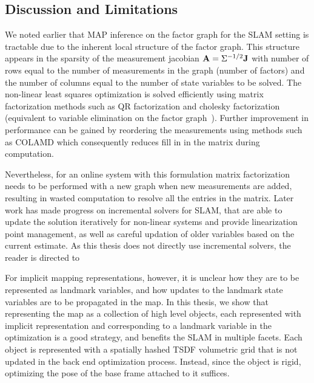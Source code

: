 \subsection{Discussion and Limitations}

We noted earlier that MAP inference on the factor graph for the SLAM setting is tractable due to the inherent local structure of the factor graph. This structure appears in the sparsity of the measurement jacobian $\mathbf{A} = \Sigma^{-1/2} \mathbf{J}$ with number of rows equal to the number of measurements in the graph (number of factors) and the number of columns equal to the number of state variables to be solved. The non-linear least squares optimization is solved efficiently using matrix factorization methods such as QR factorization and cholesky factorization (equivalent to variable elimination on the factor graph~\cite{dellaertSquareRootSAM2006}). Further improvement in performance can be gained by reordering the measurements using methods such as COLAMD \cite{davisAlgorithm8xxCOLAMD} which consequently reduces fill in in the matrix during computation.

Nevertheless, for an online system with this formulation matrix factorization needs to be performed with a new graph when new measurements are added, resulting in wasted computation to resolve all the entries in the matrix. Later work has made progress on incremental solvers for SLAM, that are able to update the solution iteratively for non-linear systems and provide linearization point management, as well as careful updation of older variables based on the current estimate. As this thesis does not directly use incremental solvers, the reader is directed to \citet{kaessISAM2IncrementalSmoothing2012}

For implicit mapping representations, however, it is unclear how they are to be represented as landmark variables, and how updates to the landmark state variables are to be propagated in the map. In this thesis, we show that representing the map as a collection of high level objects, each represented with implicit representation and corresponding to a landmark variable in the optimization is a good strategy, and benefits the SLAM in multiple facets. Each object is represented with a spatially hashed TSDF volumetric grid \cite{prisacariuInfiniTAMV3Framework2017} \cite{niessnerRealtime3DReconstruction2013} \cite{dongGPUAcceleratedRobust2019} that is not updated in the back end optimization process. Instead, since the object is rigid, optimizing the pose of the base frame attached to it suffices.
\clearpage

